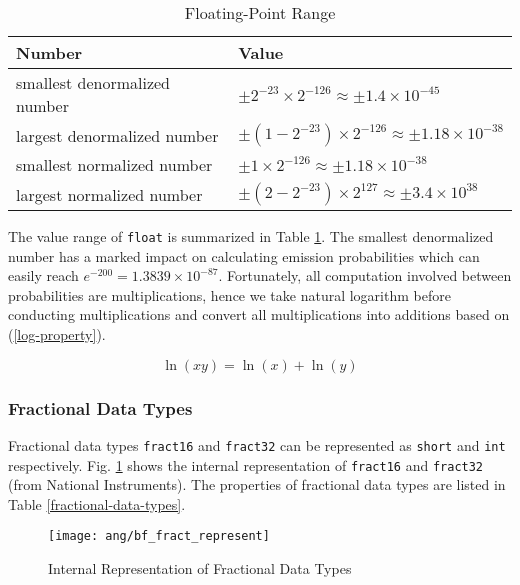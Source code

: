\begin{table}[H]
\centering
\begin{tabu} to \textwidth {XX}
\toprule
Number &Value\\
\hline
smallest denormalized number &$\pm 2^{-23} \times 2^{-126} \approx \pm 1.4 \times 10^{-45}$\\
\hline
largest denormalized number &$\pm (1-2^{-23}) \times 2^{-126} \approx \pm 1.18 \times 10^{-38}$\\
\hline
smallest normalized number &$\pm 1 \times 2^{-126} \approx \pm 1.18 \times 10^{-38}$\\
\hline
largest normalized number &$\pm (2-2^{-23}) \times 2^{127} \approx \pm 3.4 \times 10^{38}$\\
\bottomrule
\end{tabu}
\caption{Floating-Point Range}
\label{floating-point-range}
\end{table}

The value range of \texttt{float} is summarized in Table \ref{floating-point-range}. The smallest denormalized number has a marked impact on calculating emission probabilities which can easily reach $e^{-200} = 1.3839 \times 10^{-87}$. Fortunately, all computation involved between probabilities are multiplications, hence we take natural logarithm before conducting multiplications and convert all multiplications into additions based on (\ref{log-property}).

\begin{equation}
\label{log-property}
\ln(xy) = \ln(x) + \ln(y)
\end{equation}


\subsubsection{Fractional Data Types}

Fractional data types \texttt{fract16} and \texttt{fract32} can be represented as \texttt{short} and \texttt{int} respectively. Fig. \ref{bf_fract_represent} shows the internal representation of \texttt{fract16} and \texttt{fract32} (from National Instruments). The properties of fractional data types are listed in Table \ref{fractional-data-types}.

\begin{figure}[H]
\centering
\texttt{[image: ang/bf\_fract\_represent]}
\caption{Internal Representation of Fractional Data Types}
\label{bf_fract_represent}
\end{figure}

